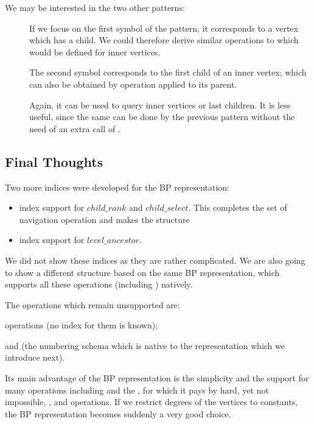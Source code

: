 \bigbreak

We may be interested in the two other patterns:
\begin{description}
	\item[\str{((}]
	If we focus on the first symbol of the pattern, it corresponds to a vertex which has a child.
	We could therefore derive similar operations to \leafAny{} which would be defined for inner vertices.
	
	The second symbol corresponds to the first child of an inner vertex; which can also be obtained by \childFirst{} operation applied to its parent.
	
	\item[\str{))}]
	Again, it can be used to query inner vertices or last children.
	It is less useful, since the same can be done by the previous pattern without the need of an extra call of \findOpen{}.
\end{description}

\subsection{Final Thoughts}


Two more indices were developed for the BP representation:
\begin{itemize}
	\item index support for $child\_rank$ and $child\_select$.
	This completes the set of navigation operation and makes the structure 
	\item index support for $level\_ancestor$.
\end{itemize}
We did not show these indices as they are rather complicated.
We are also going to show a different structure based on the same BP representation, which supports all these operations (including \levelAny{}) natively.

The operations which remain unsupported are:
\begin{iteminline}
	\item \levelAny{} operations (no index for them is known);
	\item \dfudsRank{} and \dfudsSelect{} (the numbering schema which is native to the representation which we introduce next).
\end{iteminline}

Its main advantage of the BP representation is the simplicity and the support for many operations including \lca and the \dep, for which it pays by hard, yet not impossible, \childRank, \childSelect and \degree operations.
If we restrict degrees of the vertices to constants, the BP representation becomes suddenly a very good choice.

